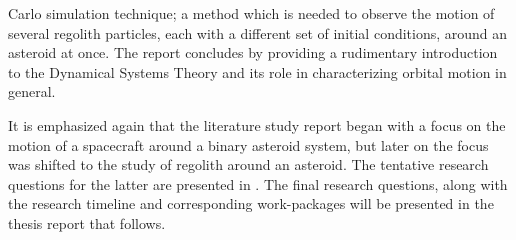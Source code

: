 Carlo simulation technique; a method which is needed to observe the motion of several regolith particles, each with a different set of initial conditions, around an asteroid at once. The report concludes by providing a rudimentary introduction to the Dynamical Systems Theory and its role in characterizing orbital motion in general.

It is emphasized again that the literature study report began with a focus on the motion of a spacecraft around a binary asteroid system, but later on the focus was shifted to the study of regolith around an asteroid. The tentative research questions for the latter are presented in . The final research questions, along with the research timeline and corresponding work-packages will be presented in the thesis report that follows.

